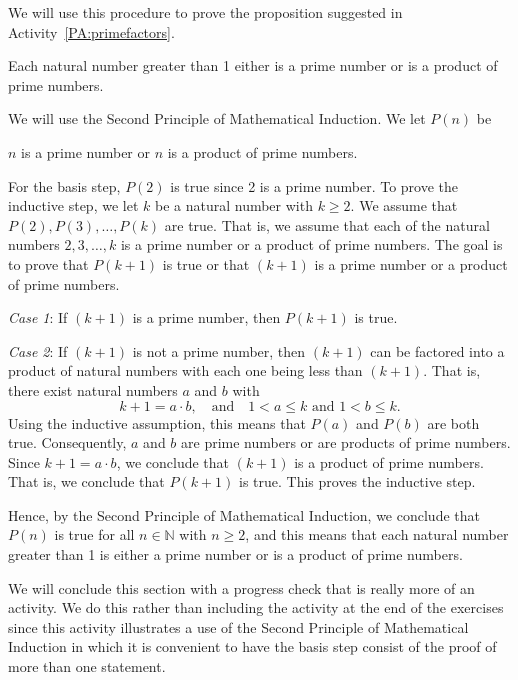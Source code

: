 \newpar
We will use this procedure to prove the proposition suggested in \typeu Activity~\ref*{PA:primefactors}.

\begin{theorem} \label{T:primefactors}
Each natural number greater than 1 either is a prime number or is a product of prime numbers.
\end{theorem}
%
\begin{myproof}
We will use the Second Principle of Mathematical Induction.  We let $P( n )$  be 
\begin{center}
$n$  is a prime number or $n$ is a product of prime numbers.
\end{center}

\noindent
For the basis step,  $P ( 2 )$ is true since  2  is a prime number.
\vskip6pt
\noindent
To prove the inductive step, we let  $k$  be a natural number with  $k \geq 2$.  We assume that  $P( 2 ),P( 3 ), \ldots ,P( k )$ are true.  That is, we assume that each of the natural numbers  $2,3, \ldots ,k$ is a prime number or a product of prime numbers.
The goal is to prove that   $P( {k + 1} )$ is true or that  $(k + 1)$ is a prime number or a product of prime numbers.

\vskip6pt
\noindent
\textit{Case 1}:  If  $\left( {k + 1} \right)$ is a prime number, then  
$P( {k + 1} )$ is true.

\vskip6pt
\noindent
\textit{Case 2}: If  $\left( {k + 1} \right)$ is not a prime number, then  
$\left( {k + 1} \right)$ can be factored into a product of natural numbers with each one being less than  $\left( {k + 1} \right)$.  That is, there exist natural numbers $a$ and $b$ with
\[
k + 1 = a \cdot b, \quad \text{and} \quad 1 < a \leq k \text{ and }  1 < b \leq k.
\]
Using the inductive assumption, this means that $P( a )$ and  $P( b )$ are both true.  Consequently,   $a$  and  $b$  are prime numbers or are products of prime numbers.  Since  $k + 1 = a \cdot b$, we conclude that  
$\left( {k + 1} \right)$ is a product of prime numbers.  That is, we conclude that  $P\left( {k + 1} \right)$ is true.  This proves the inductive step.

Hence, by the Second Principle of Mathematical Induction, we conclude that  $P( n )$
is true for all  $n \in \mathbb{N}$ with  $n \geq 2$, and this means that each natural number greater than 1 is either a prime number or is a product of prime numbers.
\end{myproof}

We will conclude this section with a progress check that is really more of an activity.  We do this rather than including the activity at the end of the exercises since this activity illustrates a use of the Second Principle of Mathematical Induction in which it is convenient to have the basis step consist of the proof of more than one statement.
\hbreak

